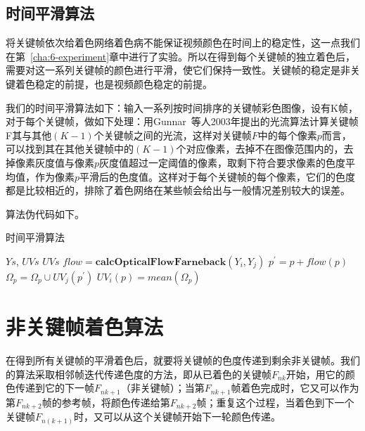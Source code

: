 \subsection{时间平滑算法}
\label{sec:5-temporal-smooth}

  将关键帧依次给着色网络着色病不能保证视频颜色在时间上的稳定性，这一点我们在第~\ref{cha:6-experiment}章中进行了实验。所以在得到每个关键帧的独立着色后，需要对这一系列关键帧的颜色进行平滑，使它们保持一致性。关键帧的稳定是非关键着色稳定的前提，也是视频颜色稳定的前提。

  我们的时间平滑算法如下：输入一系列按时间排序的关键帧彩色图像，设有K帧，对于每个关键帧，做如下处理：用Gunnar~\cite{DBLP:conf/scia/Farneback03}等人2003年提出的光流算法计算关键帧F其与其他$(K-1)$个关键帧之间的光流，这样对关键帧$F$中的每个像素$p$而言，可以找到其在其他关键帧中的$(K-1)$个对应像素，去掉不在图像范围内的，去掉像素灰度值与像素$p$灰度值超过一定阈值的像素，取剩下符合要求像素的色度平均值，作为像素$p$平滑后的色度值。这样对于每个关键帧的每个像素，它们的色度都是比较相近的，排除了着色网络在某些帧会给出与一般情况差别较大的误差。

  算法伪代码如下。

  \begin{algorithm}[H]
  \label{algo:5-temporal-smooth}
    \caption*{时间平滑算法}
    \begin{algorithmic}[1]
      \Require $Ys$, $UVs$
      \Ensure  $UVs$
            \State $flow = \textbf{calcOpticalFlowFarneback}(Y_i, Y_j)$
              \State $p^{'} = p + flow(p)$
                \State $\Omega_p = \Omega_p \cup UV_j(p^{'})$
              \EndIf
            \EndFor
          \EndFor
            \State $UV_i(p) = mean(\Omega_p)$
          \EndFor
        \EndFor
      \EndFunction
    \end{algorithmic}
  \end{algorithm}

\section{非关键帧着色算法}
\label{sec:5-interframe-color}

  在得到所有关键帧的平滑着色后，就要将关键帧的色度传递到剩余非关键帧。我们的算法采取相邻帧迭代传递色度的方法，即从已着色的关键帧$F_{nk}$开始，用它的颜色传递到它的下一帧$F_{nk+1}$（非关键帧）；当第$F_{nk+1}$帧着色完成时，它又可以作为第$F_{nk+2}$帧的参考帧，将颜色传递给第$F_{nk+2}$帧；重复这个过程，当着色到下一个关键帧$F_{n(k+1)}$时，又可以从这个关键帧开始下一轮颜色传递。

